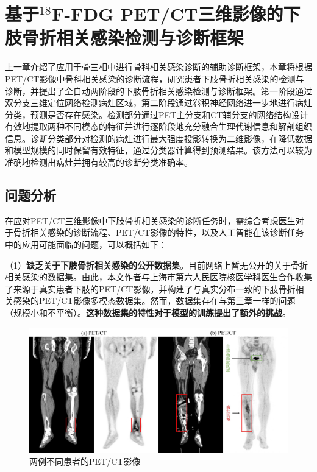 \chapter{基于\texorpdfstring{\(^{18}\)}{18}F-FDG PET/CT三维影像的下肢骨折相关感染检测与诊断框架}

上一章介绍了应用于骨三相中进行骨科相关感染诊断的辅助诊断框架，本章将根据PET/CT影像中骨科相关感染的诊断流程，研究患者下肢骨折相关感染的检测与诊断，并提出了全自动两阶段的下肢骨折相关感染检测与诊断框架。第一阶段通过双分支三维定位网络检测病灶区域，第二阶段通过卷积神经网络进一步地进行病灶分类，预测是否存在感染。检测部分通过PET主分支和CT辅分支的网络结构设计有效地提取两种不同模态的特征并进行逐阶段地充分融合生理代谢信息和解剖组织信息。诊断分类部分对检测的病灶进行最大强度投影转换为二维影像，在降低数据和模型规模的同时保留有效特征，通过分类器计算得到预测结果。该方法可以较为准确地检测出病灶并拥有较高的诊断分类准确率。

\section{问题分析}

在应对PET/CT三维影像中下肢骨折相关感染的诊断任务时，需综合考虑医生对于骨折相关感染的诊断流程、PET/CT影像的特性，以及人工智能在该诊断任务中的应用可能面临的问题，可以概括如下：

（1）\textbf{缺乏关于下肢骨折相关感染的公开数据集}。目前网络上暂无公开的关于骨折相关感染的数据集。由此，本文作者与上海市第六人民医院核医学科医生合作收集了来源于真实患者下肢的PET/CT影像，并构建了与真实分布一致的下肢骨折相关感染的PET/CT影像多模态数据集。然而，数据集存在与第三章一样的问题（规模小和不平衡）。\textbf{这种数据集的特性对于模型的训练提出了额外的挑战}。

\begin{figure}[htbp]
  \centering
  \includegraphics[width=\textwidth]{figures/chap04_petct.jpg}
  \caption{两例不同患者的PET/CT影像}
  \label{fig:chap04_petct}
\end{figure}

